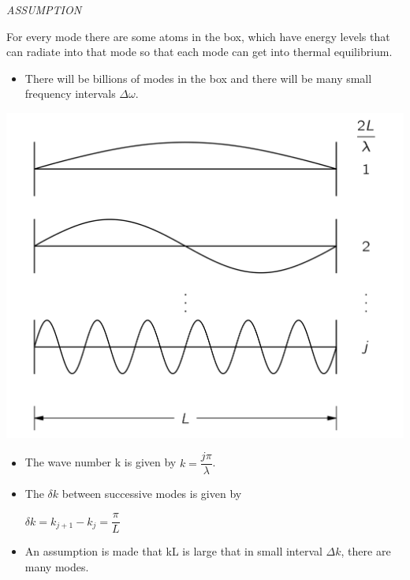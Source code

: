 \documentclass[aspectratio=169]{beamer}
\begin{document}
\begin{frame}
	\textit{ASSUMPTION}
	
		\begin{center}
		
		{\large For every mode there are some atoms in the box, which have energy levels that can radiate into that mode so that each mode can get into thermal equilibrium.}
	\end{center}
	
\end{frame}

\begin{frame}
	\begin{itemize}
		\item There will be billions of modes in the box and there will be many small frequency intervals $\Delta\omega$.
		
	\end{itemize}
	 \center \includegraphics[scale=0.6]{modes.png}
\end{frame}

\begin{frame}
	\begin{itemize}
		\item The wave number k is given by $k = \dfrac{j\pi}{\lambda}$.
		\item The $\delta k$ between successive modes is given by \pause \newline
		
			$ \delta k = k_{j+1} - k_{j} = \dfrac{\pi}{L}$\pause \newline
			
		\item An assumption is made that kL is large that in small interval $\Delta k$, there are many modes. 	
		
		 
	\end{itemize}
\end{frame}
\end{document}
